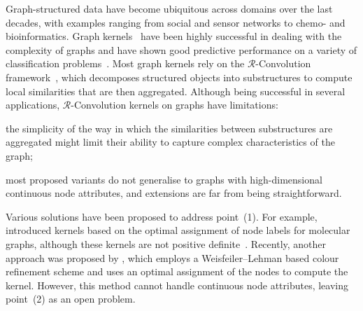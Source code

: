 \documentclass{article}
\begin{document}
Graph-structured data have become ubiquitous across domains over the last decades, with examples ranging from social and sensor networks to chemo- and bioinformatics. 
Graph kernels~\citep{vishwanathan2010graph} have been highly successful in dealing with the complexity of graphs and have shown good predictive performance on a variety of classification problems~\citep{shervashidze2011weisfeiler,morris2016faster, yanardag2015deep}. 
Most graph kernels rely on the \mbox{$\mathcal{R}$-Convolution} framework~\citep{haussler1999convolution}, which decomposes structured objects into substructures to compute local similarities that are then aggregated. Although being successful in several applications, \mbox{$\mathcal{R}$-Convolution} kernels on graphs have limitations:
\begin{inparaenum}[(1)]
 \item the simplicity of the way in which the similarities between substructures are aggregated might limit their ability to capture complex characteristics of the graph;
 \item most proposed variants do not generalise to graphs with high-dimensional continuous node attributes, and extensions are far from being straightforward.
\end{inparaenum}
Various solutions have been proposed to address point~(1). For example, \citet{frohlich2005} introduced kernels based on the optimal assignment of node labels for molecular graphs, although these kernels are not positive definite~\citep{vert2008optimal}. Recently, another approach was proposed by \citet{kriege2016oa}, which employs a Weisfeiler--Lehman based colour refinement scheme and uses an optimal assignment of the nodes to compute the kernel. However, this method cannot handle continuous node attributes, leaving point~(2) as an open problem.
 
\end{document}
